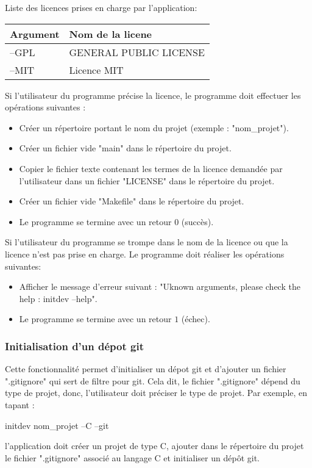 \documentclass[10pt,a4paper]{article}
\begin{document}
  Liste des licences prises en charge par l'application:
  \begin{center}
  \begin{tabular}{l|l}
    Argument & Nom de la licene \\ \hline
    --GPL & GENERAL PUBLIC LICENSE \\
    --MIT & Licence MIT \\
  \end{tabular}
\end{center}

Si l'utilisateur du programme précise la licence, le programme doit effectuer les opérations suivantes :
  \begin{itemize}
    \item Créer un répertoire portant le nom du projet (exemple : "nom\_projet").
    \item Créer un fichier vide "main" dans le répertoire du projet.
    \item Copier le fichier texte contenant les termes de la licence demandée par l'utilisateur dans un fichier "LICENSE" dans le  répertoire du projet.
    \item Créer un fichier vide "Makefile" dans le  répertoire du projet.
    \item Le programme se termine avec un retour $0$ (succès).
  \end{itemize}

  Si l'utilisateur du programme se trompe dans le nom de la licence ou que la licence n'est pas prise en charge. Le programme doit réaliser les opérations suivantes:
  \begin{itemize}
    \item Afficher le message d'erreur suivant : "Uknown arguments, please check the help : initdev --help".
    \item Le programme se termine avec un retour $1$ (échec). 
\end{itemize}

\subsubsection{Initialisation d'un dépot git}
  Cette fonctionnalité permet d'initialiser un dépot git et d'ajouter un fichier ".gitignore" qui sert de filtre pour git. Cela dit, le fichier ".gitignore" dépend du type de projet, donc, l'utilisateur doit préciser le type de projet. Par exemple, en tapant :
  \begin{center}
    initdev nom\_projet --C --git
  \end{center}
  l'application doit créer un projet de type C, ajouter dans le répertoire du projet le fichier ".gitignore" associé au langage C et initialiser un dépôt git.
\end{document}
